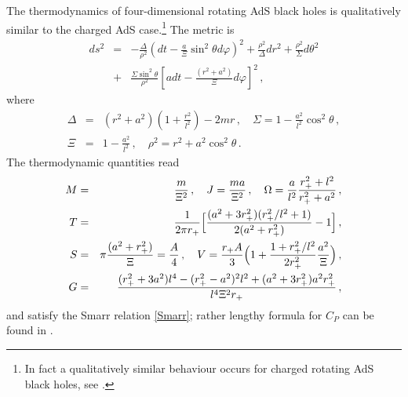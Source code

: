  
The thermodynamics of four-dimensional rotating AdS black holes is qualitatively similar to the charged AdS case.\footnote{In fact a qualitatively similar behaviour occurs for charged rotating AdS black holes, see \cite{CaldarelliEtal:2000}.} 
The metric is  
\begin{eqnarray}
ds^2&=&-\frac{\Delta}{\rho^2}(dt-\frac{a}{\Xi}\sin^2\!\theta d\varphi)^2+
\frac{\rho^2}{\Delta}dr^2+\frac{\rho^2}{\Sigma}d\theta^2 \nonumber \\
&+&
\frac{\Sigma \sin^2\!\theta}{\rho^2}[adt-\frac{(r^2+a^2)}{\Xi}d\varphi]^2\,,
\end{eqnarray}
where
\begin{eqnarray}
\Delta&=&(r^2+a^2)(1+\frac{r^2}{l^2})-2mr\,,\quad
\Sigma=1-\frac{a^2}{l^2}\cos^2\theta \,,\nonumber \\
\Xi&=&1-\frac{a^2}{l^2}\,, \quad
\rho^2=r^2+a^2\cos^2\theta \,. \nonumber
\end{eqnarray}
The thermodynamic quantities read 
\begin{eqnarray}
M&=&\frac{m}{\Xi^2}\,, \quad J=\frac{ma}{\Xi^2} \,, \quad  \Omega=\frac{a}{l^2}\frac{r_+^2+l^2}{r_+^2+a^2}\,, \nonumber\label{OHJ}\\
T&=&\frac{1}{2\pi r_+}\Bigr[\frac{(a^2+3r_+^2)(r_+^2/l^2+1)}{2(a^2+r_+^2)}-1\Bigr]\,, \nonumber\label{BHT} \\
S &=&\pi \frac{(a^2+r_+^2)}{\Xi}=\frac{A}{4} \,,\quad V=\frac{r_+A}{3}\Bigl(1+\frac{1+r_+^2/l^2}{2r_+^2}\frac{a^2}{\Xi}\Bigr)\,, \nonumber\label{BHS}\\
G &=& \frac{(r^2_+ + 3a^2) l^4 -(r^2_+ - a^2)^2 l^2 + (a^2 + 3 r^2_+)a^2 r^2_+}{l^4 \Xi^2 r_+}\,, \nonumber \\
\end{eqnarray}
and satisfy the Smarr relation \eqref{Smarr}; 
rather lengthy formula for $C_P$ can be found in \cite{MonteiroEtal:2009}.

